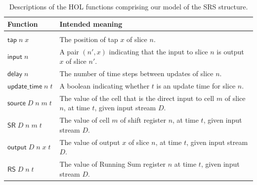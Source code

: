 \documentclass{llncs}
\begin{document}
\begin{table}
\caption{
Descriptions of the HOL functions comprising our model of the SRS structure.
\label{tab:descriptions}
}
\begin{tabular}{lp{}}
Function&Intended meaning\\
\hline\\
\(\mathsf{tap}\;n\;x\)&The position of tap $x$ of slice $n$.\\
\(\mathsf{input}\;n\)&A pair $(n',x)$ indicating that the input to slice $n$ is output $x$ of slice $n'$.\\
\(\mathsf{delay}\;n\)&The number of time steps between updates of slice $n$.\\
\(\mathsf{update\_time}\;n\;t\)&A boolean indicating whether $t$ is an update time for slice $n$.\\
\(\mathsf{source}\;D\;n\;m\;t\)&The value of the cell that is the direct input to cell $m$ of slice $n$, at time $t$, given input stream $D$.\\
\(\mathsf{SR}\;D\;n\;m\;t\)&The value of cell $m$ of shift register $n$, at time $t$, given input stream $D$.\\
\(\mathsf{output}\;D\;n\;x\;t\)&The value of output $x$ of slice $n$, at time $t$, given input stream $D$.\\
\(\mathsf{RS}\;D\;n\;t\)&The value of Running Sum register $n$ at time $t$, given input stream $D$.
\end{tabular}
\end{table}
\end{document}
